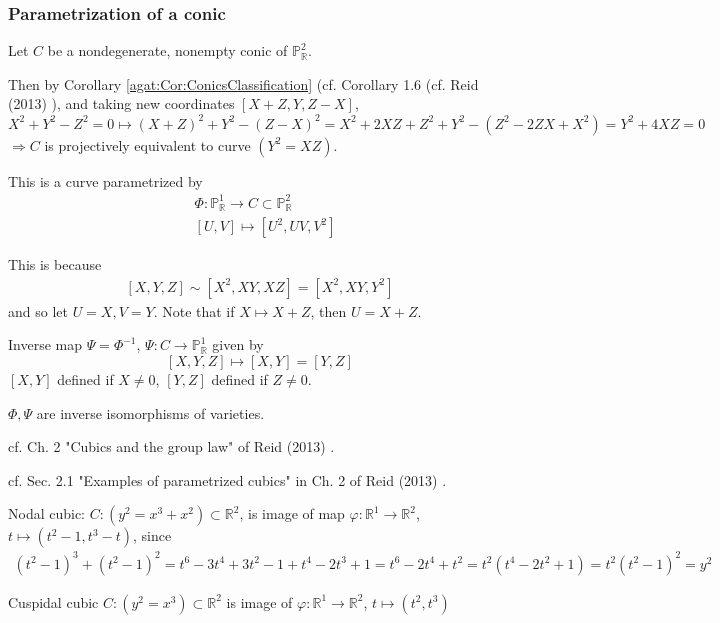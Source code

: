 \subsubsection{Parametrization of a conic}

Let $C$ be a nondegenerate, nonempty conic of $\mathbb{P}^2_{\mathbb{R}}$.

Then by Corollary \ref{agat:Cor:ConicsClassification} (cf. Corollary 1.6 (cf. Reid (2013) \cite{agat:Reid2013}), and taking new coordinates $[X+Z, Y, Z-X]$, 
\[
X^2 + Y^2-Z^2 = 0 \mapsto (X+Z)^2 + Y^2 - (Z-X)^2 = X^2 + 2XZ + Z^2 + Y^2 - (Z^2 - 2ZX + X^2) = Y^2 + 4XZ = 0
\]
$\Longrightarrow C$ is projectively equivalent to curve $(Y^2 =XZ)$.

This is a curve parametrized by 
\[
\begin{aligned} 
& \Phi : \mathbb{P}^1_{\mathbb{R}} \to C \subset \mathbb{P}^2_{\mathbb{R}} \\
& [U,V] \mapsto [ U^2, UV, V^2]
\end{aligned} 
\]

This is because 
\[
\begin{gathered}
	[X, Y, Z ] \sim [X^2 , XY , XZ ] = [X^2 , XY, Y^2]
\end{gathered}
\]
and so let $U=X, V=Y$.  Note that if $X \mapsto X+Z$, then $U=X+Z$.  

Inverse map $\Psi = \Phi^{-1}$, $\Psi : C \to \mathbb{P}^1_{\mathbb{R}}$ given by 
\[
[X,Y,Z] \mapsto [X,Y] = [Y,Z]
\]
$[X,Y]$ defined if $X \neq 0$, $[Y,Z]$ defined if $Z\neq 0$.

$\Phi, \Psi$ are inverse isomorphisms of varieties. 





cf. Ch. 2 "Cubics and the group law" of Reid (2013) \cite{agat:Reid2013}.

cf. Sec. 2.1 "Examples of parametrized cubics" in Ch. 2 of Reid (2013) \cite{agat:Reid2013}.

Nodal cubic: $C: (y^2 = x^3 + x^2) \subset \mathbb{R}^2$, is image of map $\varphi : \mathbb{R}^1 \to \mathbb{R}^2$, $t \mapsto (t^2 - 1, t^3 - t)$, since 
\[
\begin{gathered}
	(t^2 - 1)^3 + (t^2 - 1)^2 = t^6- 3t^4 + 3t^2  - 1 + t^4 - 2t^3 + 1 = t^6 - 2t^4 + t^2 = t^2 (t^4 - 2t^2 + 1) = t^2 (t^2 -1)^2 = y^2
\end{gathered}
\]

Cuspidal cubic 
$C : (y^2 = x^3) \subset \mathbb{R}^2$ is image of $\varphi: \mathbb{R}^1 \to \mathbb{R}^2$, $t\mapsto (t^2 , t^3)$

